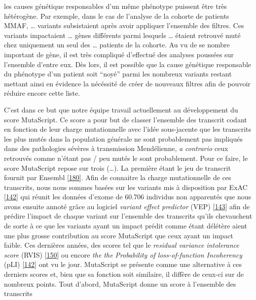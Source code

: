 \documentclass[12pt,twoside]{reedthesis}
\theoremstyle{definition}
\theoremstyle{definition}
\theoremstyle{remark}
\begin{document}
  les causes génétique responsables d'un même phénotype puissent être très
  hétérogène. Par exemple, dans le cas de l'analyse de la cohorte de
  patients MMAF, \ldots{} variants subsistaient après avoir appliquer
  l'ensemble des filtres. Ces variants impactaient \ldots{} gènes
  différents parmi lesquels \ldots{} étaient retrouvé muté chez uniquement
  un seul des \ldots{} patients de la cohorte. Au vu de se nombre
  important de gène, il est très compliqué d'effectué des analyses
  poussées sur l'ensemble d'entre eux. Dès lors, il est possible que la
  cause génétique responsable du phénotype d'un patient soit ``noyé''
  parmi les nombreux variants restant mettant ainsi en évidence la
  nécéssité de créer de nouveaux filtres afin de pouvoir réduire encore
  cette liste.
  
  C'est dans ce but que notre équipe travail actuellement au développement
  du score MutaScript. Ce score a pour but de classer l'ensemble des
  transcrit codant en fonction de leur charge mutationnelle avec l'idée
  sous-jacente que les transcrits les plus mutés dans la population
  générale ne sont probablement pas impliqués dans des pathologies sévères
  à transmission Mendélienne, \emph{a contrario} ceux retrouvés comme
  n'étant pas / peu mutés le sont probablement. Pour ce faire, le score
  MutaScript repose sur trois (\ldots{}). La première étant le jeu de
  transcrit fournit par Ensembl
  {[}\protect\hyperlink{ref-Aken2017}{180}{]}. Afin de connaitre la charge
  mutationnelle de ces transcrits, nous nous sommes basées sur les
  variants mis à disposition par ExAC
  {[}\protect\hyperlink{ref-Lek2016}{142}{]} qui réunit les données
  d'exome de 60.706 individus non apparentés que nous avons ensuite annoté
  grâce au logiciel \emph{variant effect predictor} (VEP)
  {[}\protect\hyperlink{ref-McLaren2016}{143}{]} afin de prédire l'impact
  de chaque variant sur l'ensemble des transcrits qu'ils chevauchent de
  sorte à ce que les variants ayant un impact prédit comme étant délétère
  aient une plus grosse contribution au score MutaScript que ceux ayant un
  impact faible. Ces dernières années, des scores tel que le
  \emph{residual variance intolerance score} (RVIS)
  {[}\protect\hyperlink{ref-Petrovski2013}{150}{]} ou encore \emph{the the
  Probability of loss-of-function Incoherency} (pLI)
  {[}\protect\hyperlink{ref-Lek2016}{142}{]} ont vu le jour. MutaScript se
  présente comme une alternative à ces derniers scores et, bien que sa
  fonction soit similaire, il diffère de ceux-ci sur de nombreux points.
  Tout d'abord, MutaScript donne un score à l'ensemble des transcrits
\end{document}
